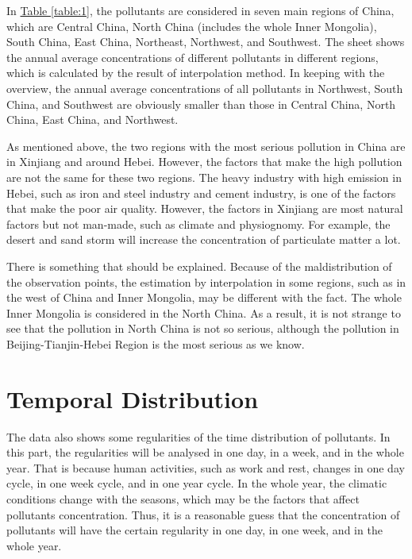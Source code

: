 \documentclass[letterpaper]{article}
\begin{document}
\begin{CJK*}{UTF8}{gkai}
  In \hyperref[table:1]{Table \ref*{table:1}}, the pollutants are considered in seven main regions of China, which are Central China, North China (includes the whole Inner Mongolia), South China, East China, Northeast, Northwest, and Southwest. The sheet shows the annual average concentrations of different pollutants in different regions, which is calculated by the result of interpolation method. In keeping with the overview, the annual average concentrations of all pollutants in Northwest, South China, and Southwest are obviously smaller than those in Central China, North China, East China, and Northwest.

  As mentioned above, the two regions with the most serious pollution in China are in Xinjiang and around Hebei. However, the factors that make the high pollution are not the same for these two regions. The heavy industry with high emission in Hebei, such as iron and steel industry and cement industry, is one of the factors that make the poor air quality. However, the factors in Xinjiang are most natural factors but not man-made, such as climate and physiognomy. For example, the desert and sand storm will increase the concentration of particulate matter a lot.

  There is something that should be explained. Because of the maldistribution of the observation points, the estimation by interpolation in some regions, such as in the west of China and Inner Mongolia, may be different with the fact. The whole Inner Mongolia is considered in the North China. As a result, it is not strange to see that the pollution in North China is not so serious, although the pollution in Beijing-Tianjin-Hebei Region is the most serious as we know.

  \section{Temporal Distribution}

  The data also shows some regularities of the time distribution of pollutants. In this part, the regularities will be analysed in one day, in a week, and in the whole year. That is because human activities, such as work and rest, changes in one day cycle, in one week cycle, and in one year cycle. In the whole year, the climatic conditions change with the seasons, which may be the factors that affect pollutants concentration. Thus, it is a reasonable guess that the concentration of pollutants will have the certain regularity in one day, in one week, and in the whole year.


\end{CJK*}
\end{document}
